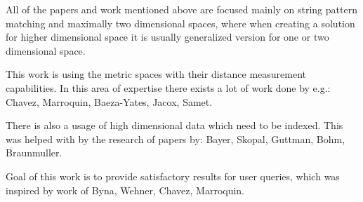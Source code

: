 All of the papers and work mentioned above are focused mainly on string pattern matching and maximally two dimensional spaces, where when creating a solution for higher dimensional space it is usually generalized version for one or two dimensional space.

This work is using the metric spaces with their distance measurement capabilities. In this area of expertise there exists a lot of work done by e.g.: Chavez, Marroquin, Baeza-Yates, Jacox, Samet.

There is also a usage of high dimensional data which need to be indexed. This was helped with by the research of papers by: Bayer, Skopal, Guttman, Bohm, Braunmuller.

Goal of this work is to provide satisfactory results for user queries, which was inspired by work of Byna, Wehner, Chavez, Marroquin.



